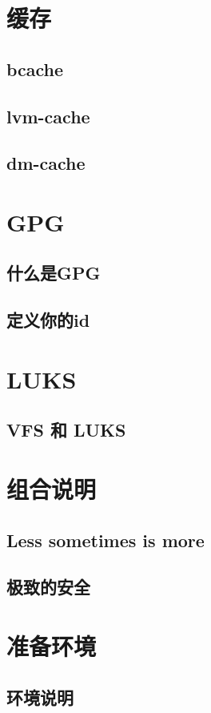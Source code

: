 \chapter{缓存}
\section{bcache}
\section{lvm-cache}
\section{dm-cache}
\chapter{GPG}
\section{什么是GPG}
\section{定义你的id}

\chapter{LUKS}
\section{VFS 和 LUKS}

\chapter{组合说明}
\section{Less sometimes is more}
\section{极致的安全}

\chapter{准备环境}
\section{环境说明}
